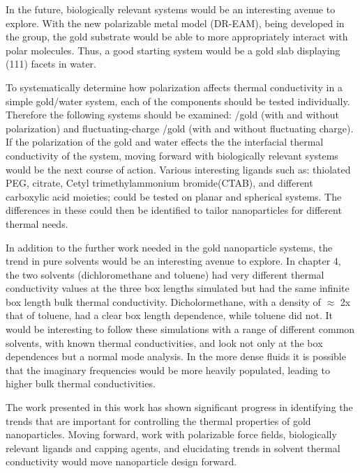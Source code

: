 In the future, biologically relevant systems would be an interesting avenue to explore. 
With the new polarizable metal model (DR-EAM), being developed in the group, the gold substrate would be able to more appropriately interact with polar molecules.
Thus, a good starting system would be a gold slab displaying (111) facets in water.

To systematically determine how polarization affects thermal conductivity in a simple gold/water system, each of the components should be tested individually. Therefore the following systems should be examined: /gold (with and without polarization) and fluctuating-charge /gold (with and without fluctuating charge).
If the polarization of the gold and water effects the the interfacial thermal conductivity of the system, moving forward with biologically relevant systems would be the next course of action.
Various interesting ligands such as: thiolated PEG, citrate, Cetyl trimethylammonium bromide(CTAB), and different carboxylic acid moieties; could be tested on planar and spherical systems. The differences in these could then be identified to tailor nanoparticles for different thermal needs.

In addition to the further work needed in the gold nanoparticle systems, the trend in pure solvents would be an interesting avenue to explore.
In chapter 4, the two solvents (dichloromethane and toluene) had very different thermal conductivity values at the three box lengths simulated but had the same infinite box length bulk thermal conductivity.
Dicholormethane, with a density of $\approx$ 2x that of toluene, had a clear box length dependence, while toluene did not. 
It would be interesting to follow these simulations with a range of different common solvents, with known thermal conductivities, and look not only at the box dependences but a normal mode analysis.
In the more dense fluids it is possible that the imaginary frequencies would be more heavily populated, leading to higher bulk thermal conductivities.

The work presented in this work has shown significant progress in identifying the trends that are important for controlling the thermal properties of gold nanoparticles. Moving forward, work with polarizable force fields, biologically relevant ligands and capping agents, and elucidating trends in solvent thermal conductivity would move nanoparticle design forward.

